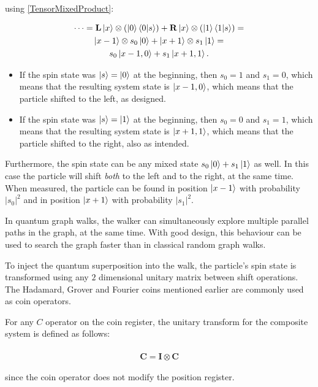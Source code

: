 using \hyperref[TensorMixedProduct]{[TensorMixedProduct]}:

\begin{gather*}
    \dots = \mathbf{L}\ket{x}\otimes(\ket{0}\bra{0}\ket{s}) + \mathbf{R}\ket{x}\otimes(\ket{1}\bra{1}\ket{s}) = \\
    \ket{x-1}\otimes{}s_0\ket{0} + \ket{x+1}\otimes{}s_1\ket{1} = \\
    s_0\ket{x-1, 0} + s_1\ket{x+1,1}.
\end{gather*}

\begin{itemize}
\item If the spin state was $\ket{s} = \ket{0}$ at the beginning, then $s_0=1$ and $s_1=0$, which means that the resulting system state is $\ket{x-1,0}$, which means that the particle shifted to the left, as designed.
\item If the spin state was $\ket{s} = \ket{1}$ at the beginning, then $s_0=0$ and $s_1=1$, which means that the resulting system state is $\ket{x+1,1}$, which means that the particle shifted to the right, also as intended.
\end{itemize}

Furthermore, the spin state can be any mixed state $s_0\ket{0} + s_1\ket{1}$ as well. In this case the particle will shift \textit{both} to the left and to the right, at the same time. When measured, the particle can be found in position $\ket{x-1}$ with probability $|s_0|^2$ and in position $\ket{x+1}$ with probability $|s_1|^2$.

In quantum graph walks, the walker can simultaneously explore multiple parallel paths in the graph, at the same time. With good design, this behaviour can be used to search the graph faster than in classical random graph walks.


To inject the quantum superposition into the walk, the particle's spin state is transformed using any $2$ dimensional unitary matrix between shift operations. The Hadamard, Grover and Fourier coins mentioned earlier are commonly used as coin operators.

For any $C$ operator on the coin register, the unitary transform for the composite system is defined as follows:

\begin{align*}
    \mathbf{\hat{C}} = \mathbf{I} \otimes \mathbf{C}
\end{align*}

since the coin operator does not modify the position register.

